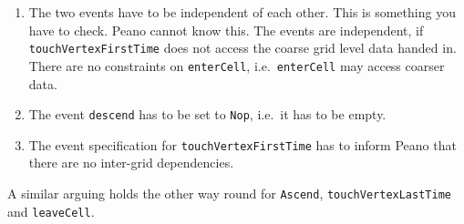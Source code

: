 \begin{enumerate}
  \item The two events have to be independent of each other. This is something
  you have to check. Peano cannot know this. The events are independent, if 
  \texttt{touchVertexFirstTime} does not access the coarse grid level data
  handed in. There are no constraints on \texttt{enterCell},
  i.e.~\texttt{enterCell} may access coarser data.
  \item The event \texttt{descend} has to be set to \texttt{Nop}, i.e.~it has to
  be empty.
  \item The event specification for \texttt{touchVertexFirstTime} has to inform
  Peano that there are no inter-grid dependencies.
\end{enumerate}

\noindent
A similar arguing holds the other way round for \texttt{Ascend},
\texttt{touchVertexLastTime} and \texttt{leaveCell}.
